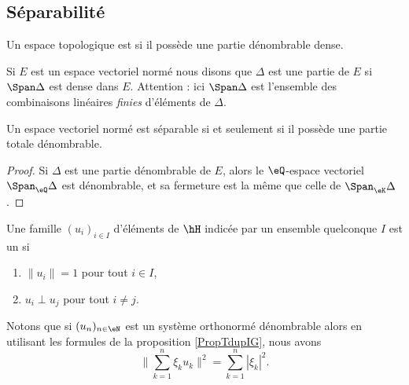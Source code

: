 \subsection{Séparabilité}

\begin{definition}
    Un espace topologique est  si il possède une partie dénombrable dense.
\end{definition}

\begin{definition}
    Si \( E\) est un espace vectoriel normé nous disons que \( \Delta\) est une partie \cite{HPJdGNV} de \( E\) si \( \Span\Delta\) est dense dans \( E\). Attention : ici \( \Span\Delta\) est l'ensemble des combinaisons linéaires \emph{finies} d'éléments de \( \Delta\).
\end{definition}

\begin{proposition}
    Un espace vectoriel normé est séparable si et seulement si il possède une partie totale dénombrable.
\end{proposition}

\begin{proof}
    Si \( \Delta\) est une partie dénombrable de \( E\), alors le \( \eQ\)-espace vectoriel \( \Span_{\eQ}\Delta\) est dénombrable, et sa fermeture est la même que celle de \( \Span_{\eK}\Delta\).
\end{proof}

\begin{definition}
    Une famille \( (u_i)_{i\in I}\) d'éléments de \( \hH\) indicée par un ensemble quelconque \( I\) est un 
     si
    \begin{enumerate}
        \item
            \( \| u_i \|=1\) pour tout \( i\in I\),
        \item
            \( u_i\perp u_j\) pour tout \( i\neq j\).
    \end{enumerate}
\end{definition}
Notons que si \( (u_n)_{n\in \eN}\) est un système orthonormé dénombrable alors en utilisant les formules de la proposition \ref{PropTdupIG}, nous avons
\begin{equation}    \label{EqCLQbMy}
    \big\| \sum_{k=1}^n\xi_ku_k \big\|^2=\sum_{k=1}^n| \xi_k |^2.
\end{equation}

